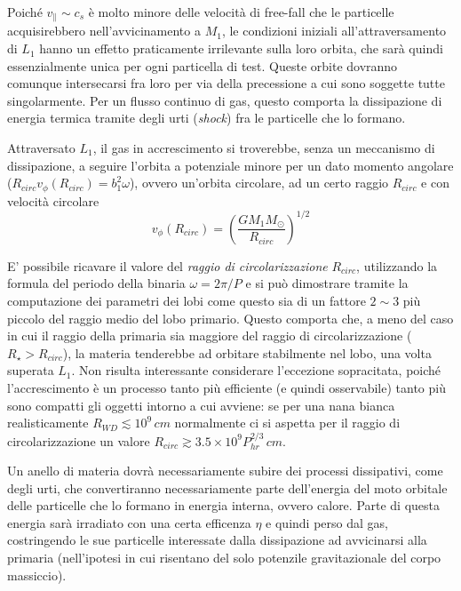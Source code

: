 \documentclass[a4paperbi]{article}
\begin{document}
	Poiché $v_\parallel\sim c_s$ è molto minore delle velocità di free-fall che le particelle acquisirebbero nell'avvicinamento a $M_1$, le condizioni iniziali all'attraversamento di $L_1$ hanno un effetto praticamente irrilevante sulla loro orbita, che sarà quindi essenzialmente unica per ogni particella di test. Queste orbite dovranno comunque intersecarsi fra loro per via della precessione a cui sono soggette tutte singolarmente. Per un flusso continuo di gas, questo comporta la dissipazione di energia termica tramite degli urti (\textit{shock}) fra le particelle che lo formano. 
	
	Attraversato $L_1$, il gas in accrescimento si troverebbe, senza un meccanismo di dissipazione, a seguire l'orbita a potenziale minore per un dato momento angolare ($R_{circ}v_\phi(R_{circ})=b_1^2\omega$), ovvero un'orbita circolare, ad un certo raggio $R_{circ}$ e con velocità circolare
	\begin{equation}
		v_\phi(R_{circ})=\left(\frac{GM_1M_\odot}{R_{circ}}\right)^{1/2}
	\end{equation}
	
	E' possibile ricavare il valore del \textit{raggio di circolarizzazione} $R_{circ}$, utilizzando la formula del periodo della binaria $\omega=2\pi/P$ e si può dimostrare tramite la computazione dei parametri dei lobi come questo sia di un fattore $2\sim3$ più piccolo del raggio medio del lobo primario. Questo comporta che, a meno del caso in cui il raggio della primaria sia maggiore del raggio di circolarizzazione ($R_\star>R_{circ}$), la materia tenderebbe ad orbitare stabilmente nel lobo, una volta superata $L_1$.
	Non risulta interessante considerare l'eccezione sopracitata, poiché l'accrescimento è un processo tanto più efficiente (e quindi osservabile) tanto più sono compatti gli oggetti intorno a cui avviene: se per una nana bianca realisticamente $R_{WD}\lesssim10^9\,cm$ normalmente ci si aspetta per il raggio di circolarizzazione un valore $R_{circ}\gtrsim3.5\times10^9P_{hr}^{2/3}\,cm$.

	Un anello di materia dovrà necessariamente subire dei processi dissipativi, come degli urti, che convertiranno necessariamente parte dell'energia del moto orbitale delle particelle che lo formano in energia interna, ovvero calore. Parte di questa energia sarà irradiato con una certa efficenza $\eta$ e quindi perso dal gas, costringendo le sue particelle interessate dalla dissipazione ad avvicinarsi alla primaria (nell'ipotesi in cui risentano del solo potenzile gravitazionale del corpo massiccio). 
	
\end{document}

